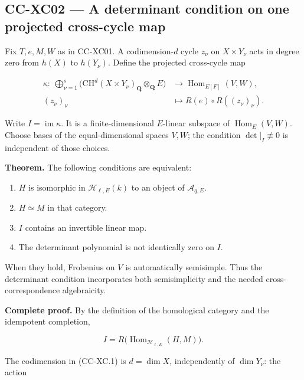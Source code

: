 \subsection{CC-XC02 --- A determinant condition on one projected
cross-cycle
map}\label{cc-xc02-a-determinant-condition-on-one-projected-cross-cycle-map}

Fix \(T,e,M,W\) as in CC-XC01. A codimension-\(d\) cycle \(z_\nu\) on
\(X\times Y_\nu\) acts in degree zero from \(h(X)\) to \(h(Y_\nu)\).
Define the projected cross-cycle map

\[
 \begin{split}
 \kappa:\ 
 \bigoplus_{\nu=1}^s
 \bigl(\mathrm{CH}^d(X\times Y_\nu)_{\mathbf Q}
              \otimes_{\mathbf Q}E\bigr)
 &\longrightarrow \operatorname{Hom}_{E[F]}(V,W),\\
 (z_\nu)_\nu&\longmapsto R(e)\circ R((z_\nu)_\nu).
 \end{split}                                      \tag{CC-XC.1}
\]

Write \(I=\operatorname{im}\kappa\). It is a finite-dimensional
\(E\)-linear subspace of \(\operatorname{Hom}_E(V,W)\). Choose bases of
the equal-dimensional spaces \(V,W\); the condition
\(\det|_I\not\equiv0\) is independent of those choices.

\textbf{Theorem.} The following conditions are equivalent:

\begin{enumerate}
\def\labelenumi{\arabic{enumi}.}
\tightlist
\item
  \(H\) is isomorphic in \(\mathcal H_{\ell,E}(k)\) to an object of
  \(\mathcal A_{q,E}\).
\item
  \(H\simeq M\) in that category.
\item
  \(I\) contains an invertible linear map.
\item
  The determinant polynomial is not identically zero on \(I\).
\end{enumerate}

When they hold, Frobenius on \(V\) is automatically semisimple. Thus the
determinant condition incorporates both semisimplicity and the needed
cross-correspondence algebraicity.

\textbf{Complete proof.} By the definition of the homological category
and the idempotent completion,

\[
 I=R\bigl(\operatorname{Hom}_{\mathcal H_{\ell,E}}(H,M)\bigr).
                                                        \tag{CC-XC.2}
\]

The codimension in (CC-XC.1) is \(d=\dim X\), independently of
\(\dim Y_\nu\): the action

